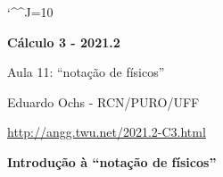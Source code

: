 \documentclass[oneside,12pt]{article}
\begin{document}
\catcode`\^^J=10

\pu


\def\pictgray#1{{\color{GrayPale}\linethickness{0.3pt}#1}}

\def\u#1{\par{\footnotesize \url{#1}}}

\def\asf#1{〈\textsf{#1}〉}

\def\drafturl{http://angg.twu.net/LATEX/2021-2-C3.pdf}
\def\drafturl{http://angg.twu.net/2021.2-C3.html}
\def\draftfooter{\tiny \href{\drafturl}{\jobname{}} \ColorBrown{\shorttoday{} \hours}}



%

\thispagestyle{empty}

\begin{center}

\vspace*{1.2cm}

{\bf \Large Cálculo 3 - 2021.2}

\bsk

Aula 11: ``notação de físicos''

\bsk

Eduardo Ochs - RCN/PURO/UFF

\url{http://angg.twu.net/2021.2-C3.html}

\end{center}

\newpage

%              

{\bf Introdução à ``notação de físicos''}
\end{document}
